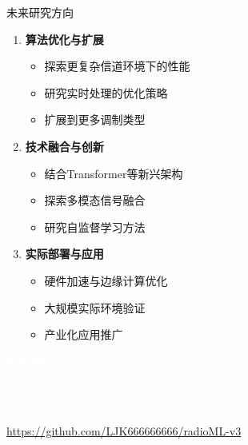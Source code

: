 \documentclass[aspectratio=169]{beamer}
\begin{document}
\begin{frame}{未来研究方向}
\begin{enumerate}
\item \textbf{算法优化与扩展}
\begin{itemize}
\item 探索更复杂信道环境下的性能
\item 研究实时处理的优化策略
\item 扩展到更多调制类型
\end{itemize}

\item \textbf{技术融合与创新}
\begin{itemize}
\item 结合Transformer等新兴架构
\item 探索多模态信号融合
\item 研究自监督学习方法
\end{itemize}

\item \textbf{实际部署与应用}
\begin{itemize}
\item 硬件加速与边缘计算优化
\item 大规模实际环境验证
\item 产业化应用推广
\end{itemize}
\end{enumerate}
\end{frame}

\begin{frame}[standout]
\centering
\Huge \textcolor{white}{\textbf{谢谢聆听！}}

\vspace{1cm}
\Large \textcolor{white}{欢迎提问与交流}

\vspace{1cm}
\normalsize
\textcolor{white}{
代码开源地址：\\
\url{https://github.com/LJK666666666/radioML-v3}
}
\end{frame}
\end{document}
